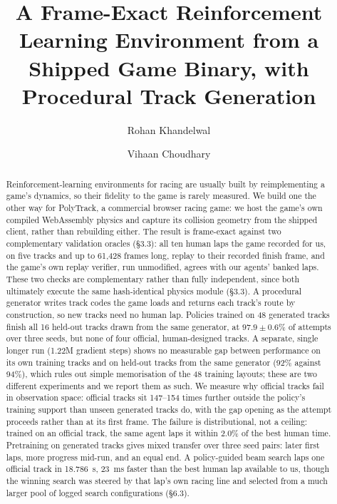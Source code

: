 \documentclass[11pt]{article}
\title{\textbf{A Frame-Exact Reinforcement Learning Environment from a Shipped Game Binary, with Procedural Track Generation}}
\author{Rohan Khandelwal \and Vihaan Choudhary}
\date{}
\begin{document}
\maketitle

\begin{abstract}
Reinforcement-learning environments for racing are usually built by reimplementing a game's dynamics, so their fidelity to the game is rarely measured. We build one the other way for PolyTrack, a commercial browser racing game: we host the game's own compiled WebAssembly physics and capture its collision geometry from the shipped client, rather than rebuilding either. The result is frame-exact against two complementary validation oracles (\S3.3): all ten human laps the game recorded for us, on five tracks and up to 61,428 frames long, replay to their recorded finish frame, and the game's own replay verifier, run unmodified, agrees with our agents' banked laps. These two checks are complementary rather than fully independent, since both ultimately execute the same hash-identical physics module (\S3.3). A procedural generator writes track codes the game loads and returns each track's route by construction, so new tracks need no human lap. Policies trained on 48 generated tracks finish all 16 held-out tracks drawn from the same generator, at $97.9 \pm 0.6\%$ of attempts over three seeds, but none of four official, human-designed tracks. A separate, single longer run (1.22M gradient steps) shows no measurable gap between performance on its own training tracks and on held-out tracks from the same generator (92\% against 94\%), which rules out simple memorisation of the 48 training layouts; these are two different experiments and we report them as such. We measure why official tracks fail in observation space: official tracks sit 147--154 times further outside the policy's training support than unseen generated tracks do, with the gap opening as the attempt proceeds rather than at its first frame. The failure is distributional, not a ceiling: trained on an official track, the same agent laps it within 2.0\% of the best human time. Pretraining on generated tracks gives mixed transfer over three seed pairs: later first laps, more progress mid-run, and an equal end. A policy-guided beam search laps one official track in 18.786~s, 23~ms faster than the best human lap available to us, though the winning search was steered by that lap's own racing line and selected from a much larger pool of logged search configurations (\S6.3).
\end{abstract}
\end{document}
